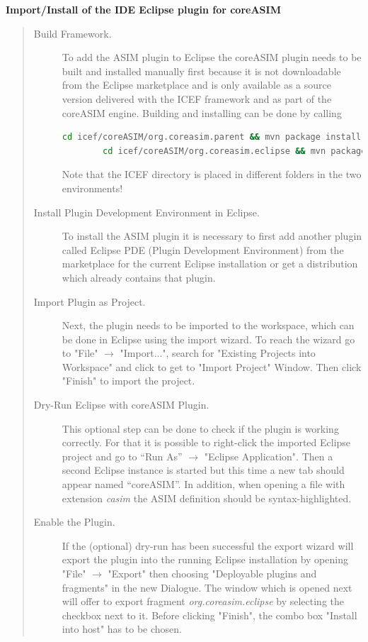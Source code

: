 \textbf{Import/Install of the IDE Eclipse plugin for coreASIM}
\begin{quote}
\small
\begin{description}
	\item[Build Framework.] To add the ASIM plugin to Eclipse the coreASIM plugin needs to be built and installed  manually first because it is not downloadable from the Eclipse marketplace and is only available as a source version delivered with the ICEF framework and as part of the coreASIM engine. Building and installing can be done by calling
	\begin{lstlisting}[language=bash]
		cd icef/coreASIM/org.coreasim.parent && mvn package install
		cd icef/coreASIM/org.coreasim.eclipse && mvn package install\end{lstlisting}
	Note that the ICEF directory is placed in different folders in the two environments!
	
	\item[Install Plugin Development Environment in Eclipse.] To install the ASIM plugin it is necessary to first add another plugin called Eclipse PDE (Plugin Development Environment) from the marketplace for the current Eclipse installation or get a distribution which already contains that plugin.
	
	\item[Import Plugin as Project.] Next, the plugin needs to be imported to the workspace, which can be done in Eclipse using the import wizard. To reach the wizard go to "File" $\rightarrow$ "Import...", search for "Existing Projects into Workspace" and click to get to "Import Project" Window. Then click "Finish" to import the project.
	
	\item[Dry-Run Eclipse with coreASIM Plugin.] This optional step can be done to check if the plugin is working correctly. For that it is possible to right-click the imported Eclipse project and go to ``Run As'' $\rightarrow$ "Eclipse Application". Then a second Eclipse instance is started but this time a new tab should appear named ``coreASIM''. In addition, when opening a file with extension \textit{casim} the ASIM definition should be syntax-highlighted.

	\item[Enable the Plugin.] If the (optional) dry-run has been successful the export wizard will export the plugin into the running Eclipse installation by opening "File" $\rightarrow$  "Export" then choosing "Deployable plugins and fragments" in the new Dialogue. The window which is opened next will offer to export fragment  \textit{org.coreasim.eclipse} by selecting the checkbox next to it. Before clicking "Finish", the combo box "Install into host" has to be chosen.
\end{description}
\end{quote}


